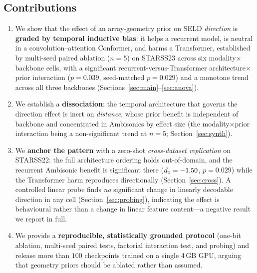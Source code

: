 \subsection{Contributions}
\begin{enumerate}
  \item We show that the effect of an array-geometry prior on SELD \emph{direction}
  is \textbf{graded by temporal inductive bias}: it helps a recurrent model, is
  neutral in a convolution--attention Conformer, and harms a Transformer,
  established by multi-seed paired ablation ($n=5$) on STARSS23 across six
  modality$\times$backbone cells, with a significant recurrent-versus-Transformer
  architecture$\times$prior interaction ($p=0.039$, seed-matched $p=0.029$) and a
  monotone trend across all three backbones (Sections~\ref{sec:main}--\ref{sec:anova}).
  \item We establish a \textbf{dissociation}: the temporal architecture that
  governs the direction effect is inert on \emph{distance}, whose prior benefit is
  independent of backbone and concentrated in Ambisonics by effect size (the
  modality$\times$prior interaction being a non-significant trend at $n=5$;
  Section~\ref{sec:synth}).
  \item We \textbf{anchor the pattern} with a zero-shot \emph{cross-dataset
  replication} on STARSS22: the full architecture ordering holds out-of-domain,
  and the recurrent Ambisonic benefit is significant there ($d_z=-1.50$,
  $p=0.029$) while the Transformer harm reproduces directionally
  (Section~\ref{sec:cross}). A controlled linear probe finds \emph{no} significant
  change in linearly decodable direction in any cell (Section~\ref{sec:probing}),
  indicating the effect is behavioural rather than a change in linear feature
  content---a negative result we report in full.
  \item We provide a \textbf{reproducible, statistically grounded protocol}
  (one-bit ablation, multi-seed paired tests, factorial interaction test, and
  probing) and release more than $100$ checkpoints trained on a single 4\,GB GPU,
  arguing that geometry priors should be ablated rather than assumed.
\end{enumerate}

